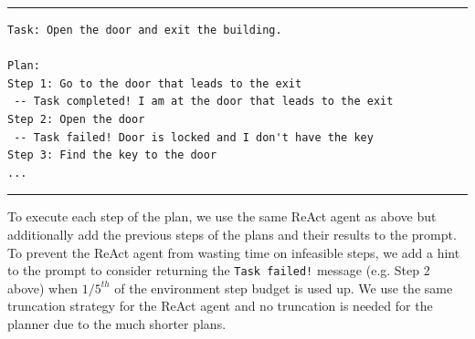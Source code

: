 \documentclass{article}
\begin{document}
\rule{\textwidth}{0.5pt}
\begin{footnotesize}
\begin{verbatim}
Task: Open the door and exit the building.

Plan:
Step 1: Go to the door that leads to the exit
 -- Task completed! I am at the door that leads to the exit
Step 2: Open the door
 -- Task failed! Door is locked and I don't have the key
Step 3: Find the key to the door
...
\end{verbatim}
\end{footnotesize}
\rule{\textwidth}{0.5pt}

To execute each step of the plan, we use the same ReAct agent as above but additionally add the previous steps of the plans and their results to the prompt. To prevent the ReAct agent from wasting time on infeasible steps, we add a hint to the prompt to consider returning the \texttt{Task failed!} message (e.g. Step 2 above) when $1/5^{th}$ of the environment step budget is used up. We use the same truncation strategy for the ReAct agent and no truncation is needed for the planner due to the much shorter plans. 
\end{document}
